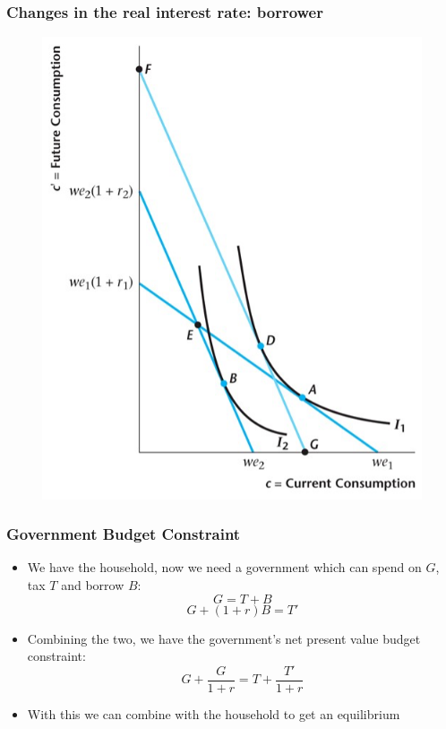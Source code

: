 \documentclass{beamer}
\begin{document}
\begin{frame}
\frametitle[alignment=center]{Changes in the real interest rate: borrower}
\begin{figure}
\centering
\includegraphics[scale=0.5]{Figures/W_Fig_9pt14.png}
\end{figure}
\end{frame}

\begin{frame}
\frametitle[alignment=center]{Government Budget Constraint}
\begin{itemize}
\item We have the household, now we need a government which can spend on $G$, tax $T$ and borrow $B$:
$$G=T+B$$
$$G+(1+r)B=T'$$
\item Combining the two, we have the government's net present value budget constraint:
$$G+\frac{G}{1+r}=T+\frac{T'}{1+r}$$
\item With this we can combine with the household to get an equilibrium
\end{itemize}
\end{frame}
\end{document}
